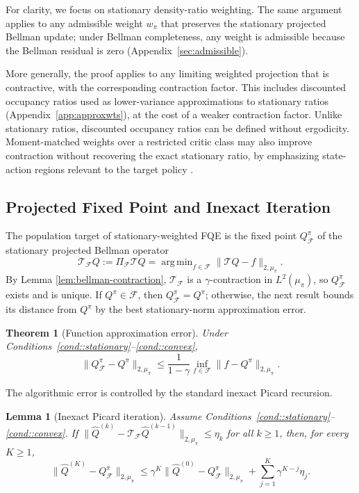 \documentclass{article}
\DeclareMathOperator*{\argmin}{arg\,min}
\theoremstyle{plain}
\newtheorem{theorem}{Theorem}
\newtheorem{lemma}{Lemma}
\theoremstyle{definition}
\theoremstyle{remark}
\begin{document}
For clarity, we focus on stationary density-ratio weighting. The same argument
applies to any admissible weight \(w_\pi\) that preserves the stationary
projected Bellman update; under Bellman completeness, any weight is admissible
because the Bellman residual is zero (Appendix~\ref{sec:admissible}).

More generally, the proof applies to any limiting weighted projection that is
contractive, with the corresponding contraction factor. This includes discounted
occupancy ratios used as lower-variance approximations to stationary ratios
(Appendix~\ref{app:approxwts}), at the cost of a weaker contraction factor.
Unlike stationary ratios, discounted occupancy ratios can be defined without
ergodicity. Moment-matched weights over a restricted critic class may also
improve contraction without recovering the exact stationary ratio, by emphasizing
state-action regions relevant to the target policy
\citep{patterson2022generalized}.



\subsection{Projected Fixed Point and Inexact Iteration}
\label{sec:projfixed}

The population target of stationary-weighted FQE is the fixed point
\(Q^\pi_{\mathcal F}\) of the stationary projected Bellman operator
\[
\mathcal T_{\mathcal F}Q
:=
\Pi_{\mathcal F}\mathcal TQ
=
\argmin_{f\in\mathcal F}\|\mathcal TQ-f\|_{2,\mu_\pi}.
\]
By Lemma \ref{lem:bellman-contraction},
\(\mathcal T_{\mathcal F}\) is a \(\gamma\)-contraction in \(L^2(\mu_\pi)\), so
\(Q^\pi_{\mathcal F}\) exists and is unique. If \(Q^\pi\in\mathcal F\), then
\(Q^\pi_{\mathcal F}=Q^\pi\); otherwise, the next result bounds its distance
from \(Q^\pi\) by the best stationary-norm approximation error.

\begin{theorem}[Function approximation error]
\label{lem:proj-fixed-point-error}
Under Conditions~\ref{cond::stationary}--\ref{cond::convex},
\[
\|Q^\pi_{\mathcal F}-Q^\pi\|_{2,\mu_\pi}
\le
\frac{1}{1-\gamma}
\inf_{f\in\mathcal F}\|f-Q^\pi\|_{2,\mu_\pi}.
\]
\end{theorem}


The algorithmic error is controlled by the standard inexact Picard recursion.

\begin{lemma}[Inexact Picard iteration]
\label{lemma::approxvaluebound}
Assume Conditions~\ref{cond::stationary}--\ref{cond::convex}. If
\(\|\widehat Q^{(k)}-\mathcal T_{\mathcal F}\widehat Q^{(k-1)}\|_{2,\mu_\pi}
\le \eta_k\) for all \(k\ge1\), then, for every \(K\ge1\),
\[
\|\widehat Q^{(K)}-Q^\pi_{\mathcal F}\|_{2,\mu_\pi}
\le
\gamma^K\|\widehat Q^{(0)}-Q^\pi_{\mathcal F}\|_{2,\mu_\pi}
+
\sum_{j=1}^K \gamma^{K-j}\eta_j .
\]
\end{lemma}
\end{document}
